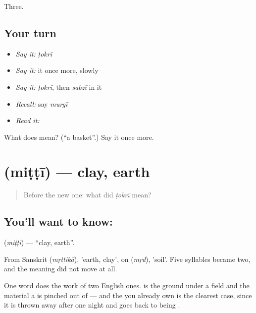 \begin{grammarlens}[title={What you've built}]
Three.
\end{grammarlens}

\subsection*{Your turn}
\begin{itemize}
\raggedright
  \item \emph{Say it:} \emph{ṭokrī}
  \item \emph{Say it:} it once more, slowly
  \item \emph{Say it:} \emph{ṭokrī}, then \emph{sabzī} in it
  \item \emph{Recall:} say \emph{murgī}
  \item \emph{Read it:} \textbf{}
\end{itemize}

\begin{tcolorbox}[breakable,colback=teal!4,colframe=teal!35!black,title={Before you move on}]
What does  mean? (\textquotedblleft{}a basket\textquotedblright{}.) Say it once more.
\end{tcolorbox}
\section[\texorpdfstring{\hi{मिट्टी} (miṭṭī)}{मिट्टी (miṭṭī)}]{ (miṭṭī) — clay, earth}

\label{lesson:HI-C62-clay}



\begin{quote}
Before the new one: what did \emph{ṭokrī} mean?
\end{quote}

\subsection*{You'll want to know: }
\textbf{} (\emph{miṭṭī}) — \textquotedblleft{}clay, earth\textquotedblright{}.

From Sanskrit  (\emph{mṛttikā}), 'earth, clay', on  (\emph{mṛd}), 'soil'. Five syllables became two, and the meaning did not move at all.

One word does the work of two English ones.  is the ground under a field and the material a  is pinched out of — and the  you already own is the clearest case, since it is thrown away after one night and goes back to being .

